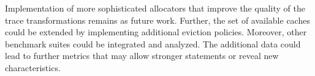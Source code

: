 \documentclass[onecolumn, openright, master, english, signatures]{dbrgrptt}
\begin{document}
Implementation of more sophisticated allocators that improve the quality of the trace transformations remains as future work.
Further, the set of available caches could be extended by implementing additional eviction policies.
Moreover, other benchmark suites could be integrated and analyzed.
The additional data could lead to further metrics that may allow stronger statements or
 reveal new characteristics.


\backmatter%

%
\end{document}
